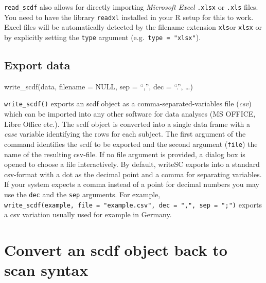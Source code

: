 \documentclass[
  letterpaper,
  DIV=11,
  numbers=noendperiod]{scrreprt}
\begin{document}
\texttt{read\_scdf} also allows for directly importing \emph{Microsoft
Excel} \texttt{.xlsx} or \texttt{.xls} files. You need to have the
library \texttt{readxl} installed in your R setup for this to work.
Excel files will be automatically detected by the filename extension
\texttt{xls}or \texttt{xlsx} or by explicitly setting the \texttt{type}
argument (e.g.~\texttt{type\ =\ "xlsx"}).

\hypertarget{sec-write-scdf}{%
\subsection{Export data}\label{sec-write-scdf}}

\begin{tcolorbox}[enhanced jigsaw, toprule=.15mm, colframe=quarto-callout-tip-color-frame, left=2mm, colback=white, breakable, bottomrule=.15mm, arc=.35mm, rightrule=.15mm, leftrule=.75mm, opacityback=0]
\begin{minipage}[t]{5.5mm}
\textcolor{quarto-callout-tip-color}{\faLightbulb}
\end{minipage}%
\begin{minipage}[t]{\textwidth - 5.5mm}
write\_scdf(data, filename = NULL, sep = ``,'', dec = ``.'',
\ldots)\end{minipage}%
\end{tcolorbox}

\texttt{write\_scdf()} exports an scdf object as a
comma-separated-variables file (\emph{csv}) which can be imported into
any other software for data analyses (MS OFFICE, Libre Office etc.). The
scdf object is converted into a single data frame with a \emph{case}
variable identifying the rows for each subject. The first argument of
the command identifies the scdf to be exported and the second argument
(\texttt{file}) the name of the resulting csv-file. If no file argument
is provided, a dialog box is opened to choose a file interactively. By
default, writeSC exports into a standard csv-format with a dot as the
decimal point and a comma for separating variables. If your system
expects a comma instead of a point for decimal numbers you may use the
\texttt{dec} and the \texttt{sep} arguments. For example,
\texttt{write\_scdf(example,\ file\ =\ "example.csv",\ dec\ =\ ",",\ sep\ =\ ";")}
exports a csv variation usually used for example in Germany.

\hypertarget{sec-convert}{%
\section{Convert an scdf object back to scan syntax}\label{sec-convert}}
\end{document}
